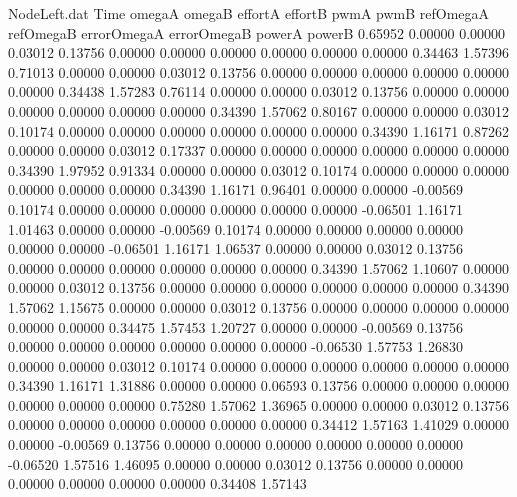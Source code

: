 \begin{filecontents}{NodeLeft.dat}
Time omegaA omegaB effortA effortB pwmA pwmB refOmegaA refOmegaB errorOmegaA errorOmegaB powerA powerB
   0.65952    0.00000    0.00000     0.03012    0.13756    0.00000    0.00000    0.00000    0.00000    0.00000    0.00000    0.34463    1.57396
   0.71013    0.00000    0.00000     0.03012    0.13756    0.00000    0.00000    0.00000    0.00000    0.00000    0.00000    0.34438    1.57283
   0.76114    0.00000    0.00000     0.03012    0.13756    0.00000    0.00000    0.00000    0.00000    0.00000    0.00000    0.34390    1.57062
   0.80167    0.00000    0.00000     0.03012    0.10174    0.00000    0.00000    0.00000    0.00000    0.00000    0.00000    0.34390    1.16171
   0.87262    0.00000    0.00000     0.03012    0.17337    0.00000    0.00000    0.00000    0.00000    0.00000    0.00000    0.34390    1.97952
   0.91334    0.00000    0.00000     0.03012    0.10174    0.00000    0.00000    0.00000    0.00000    0.00000    0.00000    0.34390    1.16171
   0.96401    0.00000    0.00000    -0.00569    0.10174    0.00000    0.00000    0.00000    0.00000    0.00000    0.00000   -0.06501    1.16171
   1.01463    0.00000    0.00000    -0.00569    0.10174    0.00000    0.00000    0.00000    0.00000    0.00000    0.00000   -0.06501    1.16171
   1.06537    0.00000    0.00000     0.03012    0.13756    0.00000    0.00000    0.00000    0.00000    0.00000    0.00000    0.34390    1.57062
   1.10607    0.00000    0.00000     0.03012    0.13756    0.00000    0.00000    0.00000    0.00000    0.00000    0.00000    0.34390    1.57062
   1.15675    0.00000    0.00000     0.03012    0.13756    0.00000    0.00000    0.00000    0.00000    0.00000    0.00000    0.34475    1.57453
   1.20727    0.00000    0.00000    -0.00569    0.13756    0.00000    0.00000    0.00000    0.00000    0.00000    0.00000   -0.06530    1.57753
   1.26830    0.00000    0.00000     0.03012    0.10174    0.00000    0.00000    0.00000    0.00000    0.00000    0.00000    0.34390    1.16171
   1.31886    0.00000    0.00000     0.06593    0.13756    0.00000    0.00000    0.00000    0.00000    0.00000    0.00000    0.75280    1.57062
   1.36965    0.00000    0.00000     0.03012    0.13756    0.00000    0.00000    0.00000    0.00000    0.00000    0.00000    0.34412    1.57163
   1.41029    0.00000    0.00000    -0.00569    0.13756    0.00000    0.00000    0.00000    0.00000    0.00000    0.00000   -0.06520    1.57516
   1.46095    0.00000    0.00000     0.03012    0.13756    0.00000    0.00000    0.00000    0.00000    0.00000    0.00000    0.34408    1.57143

\end{filecontents}
